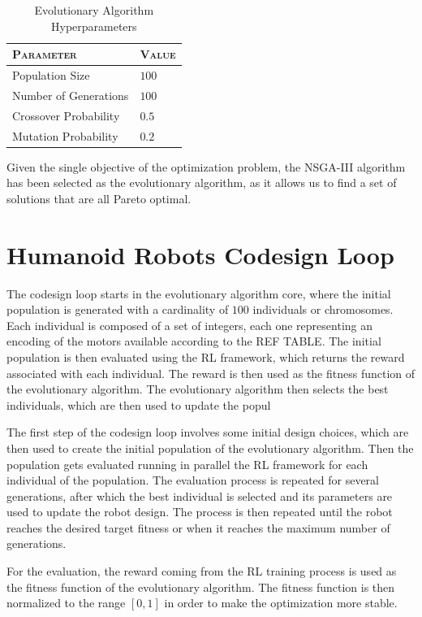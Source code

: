 \begin{table}
    \centering
    \begin{tabular}{ll}
        \toprule
        \textsc{Parameter}    & \textsc{Value} \\
        \midrule
        Population Size       & $100$          \\
        Number of Generations & $100$          \\
        Crossover Probability & $0.5$          \\
        Mutation Probability  & $0.2$          \\
        \bottomrule
    \end{tabular}
    \caption{Evolutionary Algorithm Hyperparameters}
\end{table}

Given the single objective of the optimization problem, the \ac{NSGA}-III algorithm has been selected as the evolutionary algorithm, as it allows us to find a set of solutions that are all Pareto optimal.


\section{Humanoid Robots Codesign Loop}
\label{sec:Codesign}

The codesign loop starts in the evolutionary algorithm core, where the initial population is generated with a cardinality of $100$ individuals or chromosomes. Each individual is composed of a set of integers, each one representing an encoding of the motors available according to the REF TABLE. The initial population is then evaluated using the \ac{RL} framework, which returns the reward associated with each individual. The reward is then used as the fitness function of the evolutionary algorithm. The evolutionary algorithm then selects the best individuals, which are then used to update the popul

The first step of the codesign loop involves some initial design choices, which are then used to create the initial population of the evolutionary algorithm. Then the population gets evaluated running in parallel the \ac{RL} framework for each individual of the population. The evaluation process is repeated for several generations, after which the best individual is selected and its parameters are used to update the robot design. The process is then repeated until the robot reaches the desired target fitness or when it reaches the maximum number of generations.

For the evaluation, the reward coming from the \ac{RL} training process is used as the fitness function of the evolutionary algorithm. The fitness function is then normalized to the range $[0,1]$ in order to make the optimization more stable.

